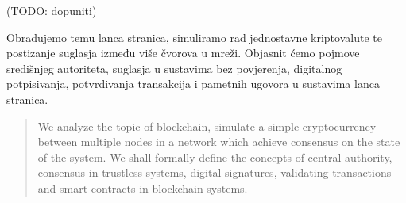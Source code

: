\documentclass[utf8, zavrsni]{fer}
\begin{document}
(TODO: dopuniti)





\begin{sazetak}
	Obrađujemo temu lanca stranica, simuliramo rad jednostavne kriptovalute te postizanje suglasja između više čvorova u mreži. Objasnit ćemo pojmove središnjeg autoriteta, suglasja u sustavima bez povjerenja, digitalnog potpisivanja, potvrđivanja transakcija i pametnih ugovora u sustavima lanca stranica.

\end{sazetak}

\begin{abstract}
    We analyze the topic of blockchain, simulate a simple cryptocurrency between multiple nodes in a network which achieve consensus on the state of the system. We shall formally define the concepts of central authority, consensus in trustless systems, digital signatures, validating transactions and smart contracts in blockchain systems.

\end{abstract}
\end{document}

